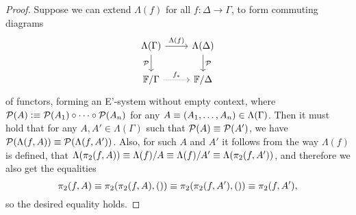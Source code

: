 \begin{proof}
Suppose we can extend $\Lambda(f)$ for all $f:\Delta\to\Gamma$, to form commuting
diagrams
\begin{equation*}
\begin{tikzcd}
\Lambda(\Gamma) \arrow[d,swap,"\mathcal{P}"] \arrow[r,"\Lambda(f)"] & \Lambda(\Delta) \arrow[d,"\mathcal{P}"] \\
\cat{F}/\Gamma \arrow[r,densely dotted,"{f_\ast}"] & \cat{F}/\Delta
\end{tikzcd}
\end{equation*}
of functors, forming an E'-system without empty context, where $\mathcal{P}(A)
\vcentcolon\equiv \mathcal{P}(A_1)\circ\cdots\circ\mathcal{P}(A_n)$ for any
$A\equiv (A_1,\ldots,A_n)\in\Lambda(\Gamma)$. Then it must hold that for any
$A,A'\in\Lambda(\Gamma)$ such that $\mathcal{P}(A)\equiv\mathcal{P}(A')$, we have
$\mathcal{P}(\Lambda(f,A))\equiv\mathcal{P}(\Lambda(f,A'))$. Also, for such
$A$ and $A'$ it follows from the way $\Lambda(f)$ is defined, 
that $\Lambda(\pi_2(f,A))\equiv \Lambda(f)/A\equiv
\Lambda(f)/A' \equiv \Lambda(\pi_2(f,A'))$, and therefore we also get the equalities
\begin{equation*}
\pi_2(f,A)\equiv \pi_2(\pi_2(f,A),())\equiv \pi_2(\pi_2(f,A'),()) \equiv \pi_2(f,A'),
\end{equation*}
so the desired equality holds.


\end{proof}
